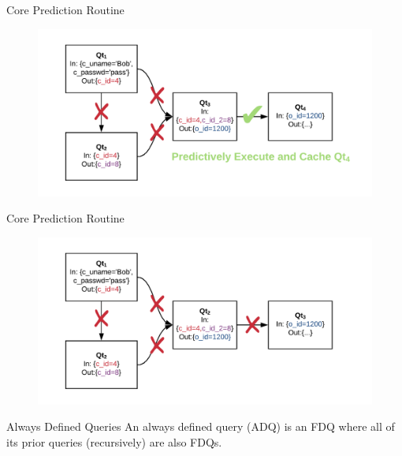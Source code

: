 \documentclass[10pt]{beamer}
\begin{document}
\begin{frame}[fragile]{Core Prediction Routine}
    \begin{figure}
        \hspace*{-1cm}
        \includegraphics[scale=0.22]{apollo_cpr_5}
    \end{figure}
\end{frame}

\begin{frame}[fragile]{Core Prediction Routine}
    \begin{figure}
        \hspace*{-1cm}
        \includegraphics[scale=0.22]{apollo_cpr}
    \end{figure}
\end{frame}

\begin{frame}[fragile]{Always Defined Queries}
    An \alert{always defined query} (ADQ) is an FDQ where all of its prior queries (recursively) are also FDQs.\\
\medskip
\end{frame}
\end{document}
